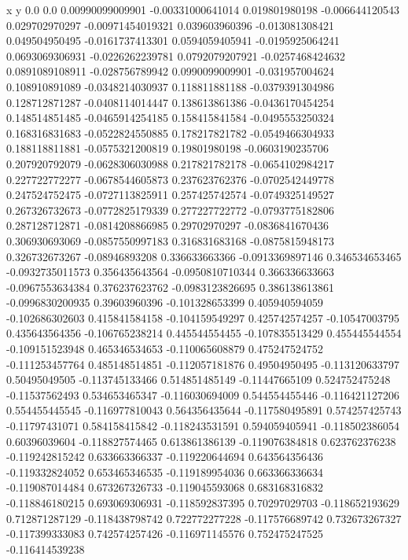               x                y
            0.0              0.0
0.00990099009901  -0.00331000641014
 0.019801980198  -0.006644120543
 0.029702970297  -0.00971454019321
 0.039603960396  -0.013081308421
 0.049504950495  -0.0161737413301
0.0594059405941  -0.0195925064241
0.0693069306931  -0.0226262239781
0.0792079207921  -0.0257468424632
0.0891089108911  -0.028756789942
0.0990099009901  -0.031957004624
 0.108910891089  -0.0348214030937
 0.118811881188  -0.0379391304986
 0.128712871287  -0.0408114014447
 0.138613861386  -0.0436170454254
 0.148514851485  -0.0465914254185
 0.158415841584  -0.0495553250324
 0.168316831683  -0.0522824550885
 0.178217821782  -0.0549466304933
 0.188118811881  -0.0575321200819
  0.19801980198  -0.0603190235706
 0.207920792079  -0.0628306030988
 0.217821782178  -0.0654102984217
 0.227722772277  -0.0678544605873
 0.237623762376  -0.0702542449778
 0.247524752475  -0.0727113825911
 0.257425742574  -0.0749325149527
 0.267326732673  -0.0772825179339
 0.277227722772  -0.0793775182806
 0.287128712871  -0.0814208866985
  0.29702970297  -0.0836841670436
 0.306930693069  -0.0857550997183
 0.316831683168  -0.0875815948173
 0.326732673267   -0.08946893208
 0.336633663366  -0.0913369897146
 0.346534653465  -0.0932735011573
 0.356435643564  -0.0950810710344
 0.366336633663  -0.0967553634384
 0.376237623762  -0.0983123826695
 0.386138613861  -0.0996830200935
  0.39603960396  -0.101328653399
 0.405940594059  -0.102686302603
 0.415841584158  -0.104159549297
 0.425742574257   -0.10547003795
 0.435643564356  -0.106765238214
 0.445544554455  -0.107835513429
 0.455445544554  -0.109151523948
 0.465346534653  -0.110065608879
 0.475247524752  -0.111253457764
 0.485148514851  -0.112057181876
  0.49504950495  -0.113120633797
  0.50495049505  -0.113745133466
 0.514851485149   -0.11447665109
 0.524752475248   -0.11537562493
 0.534653465347  -0.116030694009
 0.544554455446  -0.116421127206
 0.554455445545  -0.116977810043
 0.564356435644  -0.117580495891
 0.574257425743   -0.11797431071
 0.584158415842  -0.118243531591
 0.594059405941  -0.118502386054
  0.60396039604  -0.118827574465
 0.613861386139  -0.119076384818
 0.623762376238  -0.119242815242
 0.633663366337  -0.119220644694
 0.643564356436  -0.119332824052
 0.653465346535  -0.119189954036
 0.663366336634  -0.119087014484
 0.673267326733  -0.119045593068
 0.683168316832  -0.118846180215
 0.693069306931  -0.118592837395
  0.70297029703  -0.118652193629
 0.712871287129  -0.118438798742
 0.722772277228  -0.117576689742
 0.732673267327  -0.117399333083
 0.742574257426  -0.116971145576
 0.752475247525  -0.116414539238
